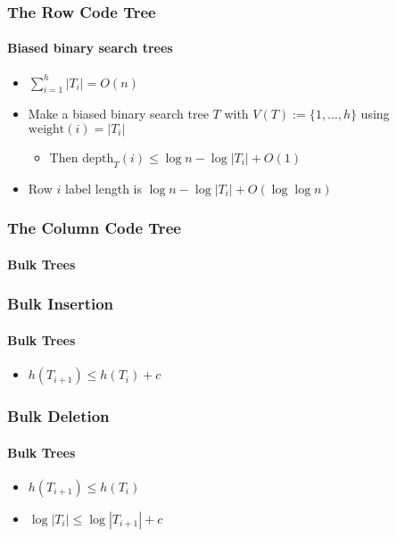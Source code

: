 \documentclass[aspectratio=169,xcolor=dvipsnames]{beamer}
\begin{document}
\begin{frame}
    \frametitle{The Row Code Tree}
    \framesubtitle{Biased binary search trees}

    \begin{itemize}
        \item<+-> $\sum_{i=1}^h |T_i| = O(n)$
        \item<+-> Make a biased binary search tree $T$ with $V(T):=\{1,\ldots,h\}$  using $\mathrm{weight}(i)=|T_i|$
        \begin{itemize}
            \item<+-> Then $\mathrm{depth}_T(i) \le \log n - \log |T_i| + O(1)$
        \end{itemize}
        \item<+-> Row $i$ label length is $\log n-\log |T_i| + O(\log\log n)$
    \end{itemize}
\end{frame}

\begin{frame}
    \frametitle{The Column Code Tree}
    \framesubtitle{Bulk Trees}

    \begin{center}
    \end{center}
\end{frame}


\begin{frame}
    \frametitle{Bulk Insertion}
    \framesubtitle{Bulk Trees}

    \begin{center}
    \end{center}
    \begin{itemize}
        \item<6> $h(T_{i+1})\le h(T_i)+c$
    \end{itemize}
\end{frame}

\begin{frame}
    \frametitle{Bulk Deletion}
    \framesubtitle{Bulk Trees}

    \begin{center}
    \end{center}
    \begin{itemize}
        \item<7-> $h(T_{i+1}) \le h(T_i)$
        \item<8-> $\log|T_i|\le \log|T_{i+1}| + c$
    \end{itemize}
\end{frame}
\end{document}
